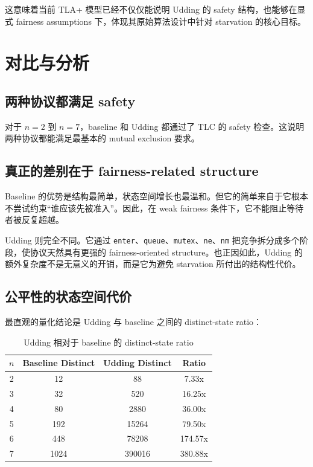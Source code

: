 \documentclass[11pt]{ctexart}
\begin{document}
这意味着当前 TLA+ 模型已经不仅仅能说明 Udding 的 safety 结构，也能够在显式 fairness assumptions 下，体现其原始算法设计中针对 starvation 的核心目标。

\section{对比与分析}

\subsection{两种协议都满足 safety}

对于 $n=2$ 到 $n=7$，baseline 和 Udding 都通过了 TLC 的 safety 检查。这说明两种协议都能满足最基本的 mutual exclusion 要求。

\subsection{真正的差别在于 fairness-related structure}

Baseline 的优势是结构最简单，状态空间增长也最温和。但它的简单来自于它根本不尝试约束“谁应该先被准入”。因此，在 weak fairness 条件下，它不能阻止等待者被反复超越。

Udding 则完全不同。它通过 \texttt{enter}、\texttt{queue}、\texttt{mutex}、\texttt{ne}、\texttt{nm} 把竞争拆分成多个阶段，使协议天然具有更强的 fairness-oriented structure。也正因如此，Udding 的额外复杂度不是无意义的开销，而是它为避免 starvation 所付出的结构性代价。

\subsection{公平性的状态空间代价}

最直观的量化结论是 Udding 与 baseline 之间的 distinct-state ratio：

\begin{table}[H]
\centering
\caption{Udding 相对于 baseline 的 distinct-state ratio}
\begin{tabular}{cccc}
\toprule
$n$ & Baseline Distinct & Udding Distinct & Ratio \\
\midrule
2 & 12 & 88 & 7.33x \\
3 & 32 & 520 & 16.25x \\
4 & 80 & 2880 & 36.00x \\
5 & 192 & 15264 & 79.50x \\
6 & 448 & 78208 & 174.57x \\
7 & 1024 & 390016 & 380.88x \\
\bottomrule
\end{tabular}
\end{table}
\end{document}
